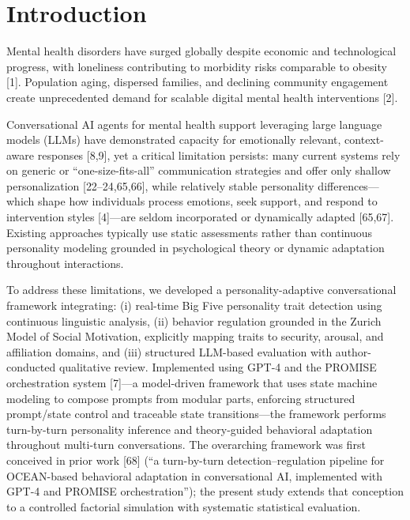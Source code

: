 \section{Introduction}\label{introduction}

Mental health disorders have surged globally despite economic and technological progress, with loneliness contributing to morbidity risks comparable to obesity {[}1{]}. Population aging, dispersed families, and declining community engagement create unprecedented demand for scalable digital mental health interventions {[}2{]}.

Conversational AI agents for mental health support leveraging large language models (LLMs) have demonstrated capacity for emotionally relevant, context-aware responses {[}8,9{]}, yet a critical limitation persists: many current systems rely on generic or ``one-size-fits-all'' communication strategies and offer only shallow personalization {[}22--24,65,66{]}, while relatively stable personality differences---which shape how individuals process emotions, seek support, and respond to intervention styles {[}4{]}---are seldom incorporated or dynamically adapted {[}65,67{]}. Existing approaches typically use static assessments rather than continuous personality modeling grounded in psychological theory or dynamic adaptation throughout interactions.

To address these limitations, we developed a personality-adaptive conversational framework integrating: (i) real-time Big Five personality trait detection using continuous linguistic analysis, (ii) behavior regulation grounded in the Zurich Model of Social Motivation, explicitly mapping traits to security, arousal, and affiliation domains, and (iii) structured LLM-based evaluation with author-conducted qualitative review. Implemented using GPT-4 and the PROMISE orchestration system {[}7{]}---a model-driven framework that uses state machine modeling to compose prompts from modular parts, enforcing structured prompt/state control and traceable state transitions---the framework performs turn-by-turn personality inference and theory-guided behavioral adaptation throughout multi-turn conversations. The overarching framework was first conceived in prior work {[}68{]} (``a turn-by-turn detection--regulation pipeline for OCEAN-based behavioral adaptation in conversational AI, implemented with GPT-4 and PROMISE orchestration''); the present study extends that conception to a controlled factorial simulation with systematic statistical evaluation.

